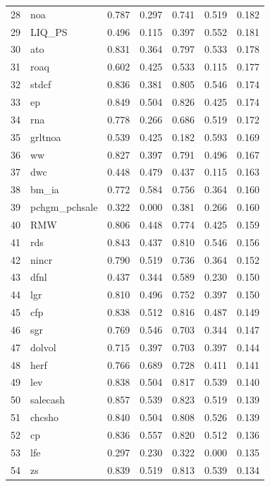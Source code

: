 \begin{footnotesize}
\begin{longtable}{rl|c|c|c|c|c}
		28 & noa & 0.787 & 0.297 & 0.741 & 0.519 & 0.182 \\ 
		29 & LIQ\_PS & 0.496 & 0.115 & 0.397 & 0.552 & 0.181 \\ 
		30 & ato & 0.831 & 0.364 & 0.797 & 0.533 & 0.178 \\ 
		31 & roaq & 0.602 & 0.425 & 0.533 & 0.115 & 0.177 \\ 
		32 & stdcf & 0.836 & 0.381 & 0.805 & 0.546 & 0.174 \\ 
		33 & ep & 0.849 & 0.504 & 0.826 & 0.425 & 0.174 \\ 
		34 & rna & 0.778 & 0.266 & 0.686 & 0.519 & 0.172 \\ 
		35 & grltnoa & 0.539 & 0.425 & 0.182 & 0.593 & 0.169 \\ 
		36 & ww & 0.827 & 0.397 & 0.791 & 0.496 & 0.167 \\ 
		37 & dwc & 0.448 & 0.479 & 0.437 & 0.115 & 0.163 \\ 
		38 & bm\_ia & 0.772 & 0.584 & 0.756 & 0.364 & 0.160 \\ 
		39 & pchgm\_pchsale & 0.322 & 0.000 & 0.381 & 0.266 & 0.160 \\ 
		40 & RMW & 0.806 & 0.448 & 0.774 & 0.425 & 0.159 \\ 
		41 & rds & 0.843 & 0.437 & 0.810 & 0.546 & 0.156 \\ 
		42 & nincr & 0.790 & 0.519 & 0.736 & 0.364 & 0.152 \\ 
		43 & dfnl & 0.437 & 0.344 & 0.589 & 0.230 & 0.150 \\ 
		44 & lgr & 0.810 & 0.496 & 0.752 & 0.397 & 0.150 \\ 
		45 & cfp & 0.838 & 0.512 & 0.816 & 0.487 & 0.149 \\ 
		46 & sgr & 0.769 & 0.546 & 0.703 & 0.344 & 0.147 \\ 
		47 & dolvol & 0.715 & 0.397 & 0.703 & 0.397 & 0.144 \\ 
		48 & herf & 0.766 & 0.689 & 0.728 & 0.411 & 0.141 \\ 
		49 & lev & 0.838 & 0.504 & 0.817 & 0.539 & 0.140 \\ 
		50 & salecash & 0.857 & 0.539 & 0.823 & 0.519 & 0.139 \\ 
		51 & chcsho & 0.840 & 0.504 & 0.808 & 0.526 & 0.139 \\ 
		52 & cp & 0.836 & 0.557 & 0.820 & 0.512 & 0.136 \\ 
		53 & lfe & 0.297 & 0.230 & 0.322 & 0.000 & 0.135 \\ 
		54 & zs & 0.839 & 0.519 & 0.813 & 0.539 & 0.134 \\ 

\end{longtable}
\end{footnotesize}
